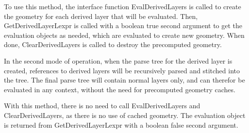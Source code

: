 To use this method, the interface function {\vt EvalDerivedLayers} is
called to create the geometry for each derived layer that will be
evaluated.  Then, {\vt GetDerivedLayerLexpr} is called with a boolean
true second argument to get the evaluation objects as needed, which
are evaluated to create new geometry.  When done, {\vt
ClearDerivedLayers} is called to destroy the precomputed geometry.

In the second mode of operation, when the parse tree for the derived
layer is created, references to derived layers will be recursively
parsed and stitched into the tree.  The final parse tree will contain
normal layers only, and can therefor be evaluated in any context,
without the need for precomputed geometry caches.

With this method, there is no need to call {\vt EvalDerivedLayers} and
{\vt ClearDerivedLayers}, as there is no use of cached geometry.  The
evaluation object is returned from {\vt GetDerivedLayerLexpr} with a
boolean false second argument.

